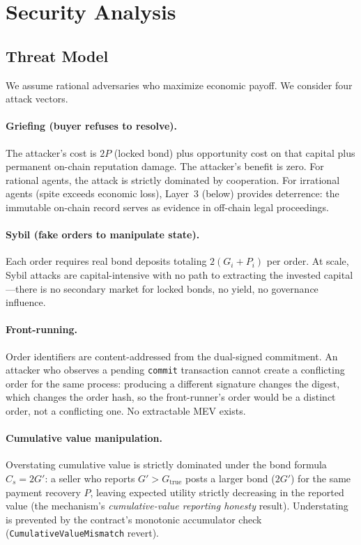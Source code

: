 \documentclass[11pt,a4paper]{article}
\theoremstyle{definition}
\theoremstyle{remark}
\newcommand{\pay}{P}
\newcommand{\cumval}{G}
\newcommand{\sbond}{C_s}
\begin{document}
\section{Security Analysis}
\label{sec:security}

\subsection{Threat Model}

We assume rational adversaries who maximize economic payoff. We
consider four attack vectors.

\paragraph{Griefing (buyer refuses to resolve).}
The attacker's cost is $2\pay$ (locked bond) plus opportunity cost on
that capital plus permanent on-chain reputation damage. The attacker's
benefit is zero. For rational agents, the attack is strictly
dominated by cooperation. For irrational agents (spite exceeds
economic loss), Layer~3 (below) provides deterrence: the immutable
on-chain record serves as evidence in off-chain legal proceedings.

\paragraph{Sybil (fake orders to manipulate state).}
Each order requires real bond deposits totaling $2(\cumval_i +
\pay_i)$ per order. At scale, Sybil attacks are capital-intensive
with no path to extracting the invested capital---there is no
secondary market for locked bonds, no yield, no governance influence.

\paragraph{Front-running.}
Order identifiers are content-addressed from the dual-signed
commitment. An attacker who observes a pending \texttt{commit}
transaction cannot create a conflicting order for the same process:
producing a different signature changes the digest, which changes
the order hash, so the front-runner's order would be a distinct
order, not a conflicting one. No extractable MEV exists.

\paragraph{Cumulative value manipulation.}
Overstating cumulative value is strictly dominated under the bond
formula $\sbond = 2\cumval'$: a seller who reports
$\cumval' > \cumval_{\text{true}}$ posts a larger bond
($2\cumval'$) for the same payment recovery $\pay$, leaving expected
utility strictly decreasing in the reported value (the mechanism's
\emph{cumulative-value reporting honesty} result). Understating is
prevented by the contract's monotonic accumulator check
(\texttt{CumulativeValueMismatch} revert).
\end{document}
